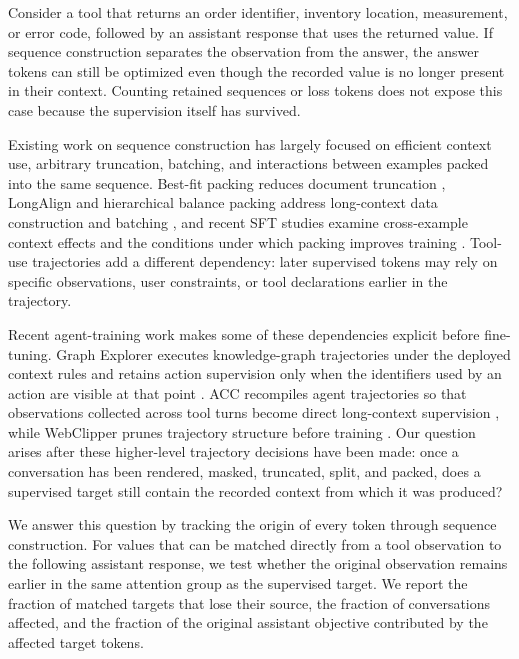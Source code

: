 \documentclass[pdflatex,sn-basic,Numbered]{sn-jnl}
\begin{document}
Consider a tool that returns an order identifier, inventory location, measurement, or error code, followed by an assistant response that uses the returned value. If sequence construction separates the observation from the answer, the answer tokens can still be optimized even though the recorded value is no longer present in their context. Counting retained sequences or loss tokens does not expose this case because the supervision itself has survived.

Existing work on sequence construction has largely focused on efficient context use, arbitrary truncation, batching, and interactions between examples packed into the same sequence. Best-fit packing reduces document truncation \citep{ding2024fewer}, LongAlign and hierarchical balance packing address long-context data construction and batching \citep{bai2024longalign,yao2025hbp}, and recent SFT studies examine cross-example context effects and the conditions under which packing improves training \citep{dong2024tfp,wang2024packing}. Tool-use trajectories add a different dependency: later supervised tokens may rely on specific observations, user constraints, or tool declarations earlier in the trajectory.

Recent agent-training work makes some of these dependencies explicit before fine-tuning. Graph Explorer executes knowledge-graph trajectories under the deployed context rules and retains action supervision only when the identifiers used by an action are visible at that point \citep{chen2026graphexplorer}. ACC recompiles agent trajectories so that observations collected across tool turns become direct long-context supervision \citep{su2026acc}, while WebClipper prunes trajectory structure before training \citep{wang2026webclipper}. Our question arises after these higher-level trajectory decisions have been made: once a conversation has been rendered, masked, truncated, split, and packed, does a supervised target still contain the recorded context from which it was produced?

We answer this question by tracking the origin of every token through sequence construction. For values that can be matched directly from a tool observation to the following assistant response, we test whether the original observation remains earlier in the same attention group as the supervised target. We report the fraction of matched targets that lose their source, the fraction of conversations affected, and the fraction of the original assistant objective contributed by the affected target tokens.
\end{document}
